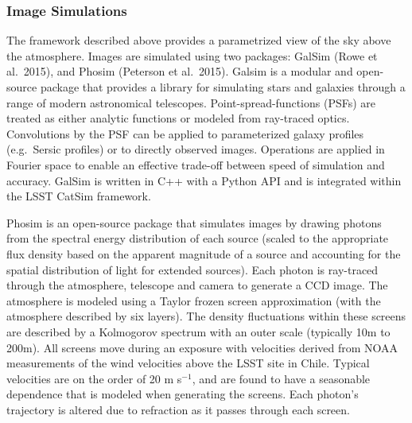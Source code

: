 {\subsubsection{Image Simulations}
\label{sec:imsim}

The framework described above provides a parametrized view of the sky
above the atmosphere. Images are simulated using two packages: GalSim
(Rowe et al.~2015), and Phosim (Peterson et al.~2015). Galsim is a
modular and open-source package that provides a library for simulating
stars and galaxies through a range of modern astronomical
telescopes. Point-spread-functions (PSFs) are treated as either
analytic functions or modeled from ray-traced optics. Convolutions by
the PSF can be applied to parameterized galaxy profiles (e.g.\
Sersic profiles) or to directly observed images. Operations are
applied in Fourier space to enable an effective trade-off between
speed of simulation and accuracy. GalSim is written in C++ with a
Python API and is integrated within the LSST CatSim framework.

Phosim is an open-source package that simulates images by drawing
photons from the spectral energy distribution of each source (scaled
to the appropriate flux density based on the apparent magnitude of a
source and accounting for the spatial distribution of light for
extended sources). Each photon is ray-traced through the atmosphere,
telescope and camera to generate a CCD image. The atmosphere is
modeled using a Taylor frozen screen approximation (with the
atmosphere described by six layers). The density fluctuations within
these screens are described by a Kolmogorov spectrum with an outer
scale (typically 10m to 200m). All screens move during an exposure
with velocities derived from NOAA measurements of the wind velocities
above the LSST site in Chile.  Typical velocities are on the order of
20 m s$^{-1}$, and are found to have a seasonable dependence that is
modeled when generating the screens. Each photon's trajectory is
altered due to refraction as it passes through each screen.


}
